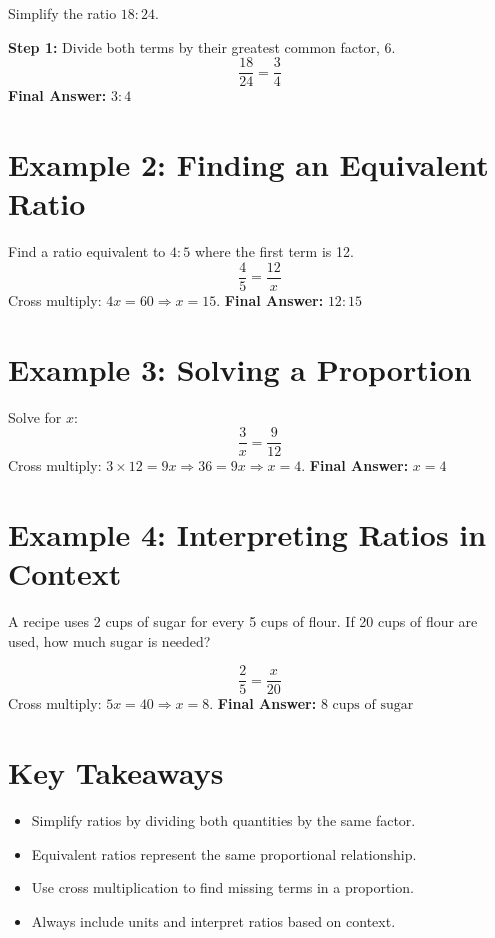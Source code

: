 \documentclass[14pt]{extarticle}
\begin{document}
Simplify the ratio \(18:24\).

\textbf{Step 1:} Divide both terms by their greatest common factor, 6.  
\[
\frac{18}{24} = \frac{3}{4}
\]
\textbf{Final Answer:} \(\boxed{3:4}\)

\section*{Example 2: Finding an Equivalent Ratio}

Find a ratio equivalent to \(4:5\) where the first term is 12.  
\[
\frac{4}{5} = \frac{12}{x}
\]
Cross multiply: \(4x = 60 \Rightarrow x = 15.\)  
\textbf{Final Answer:} \(\boxed{12:15}\)

\section*{Example 3: Solving a Proportion}

Solve for \(x\):
\[
\frac{3}{x} = \frac{9}{12}
\]
Cross multiply: \(3 \times 12 = 9x \Rightarrow 36 = 9x \Rightarrow x = 4.\)  
\textbf{Final Answer:} \(\boxed{x = 4}\)

\section*{Example 4: Interpreting Ratios in Context}

A recipe uses 2 cups of sugar for every 5 cups of flour. If 20 cups of flour are used, how much sugar is needed?

\[
\frac{2}{5} = \frac{x}{20}
\]
Cross multiply: \(5x = 40 \Rightarrow x = 8.\)  
\textbf{Final Answer:} \(\boxed{8\text{ cups of sugar}}\)

\section*{Key Takeaways}
\begin{itemize}
    \item Simplify ratios by dividing both quantities by the same factor.
    \item Equivalent ratios represent the same proportional relationship.
    \item Use cross multiplication to find missing terms in a proportion.
    \item Always include units and interpret ratios based on context.
\end{itemize}

\newpage
\end{document}
